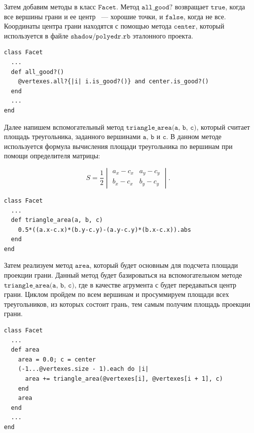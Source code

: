 Затем добавим методы в класс $\texttt{Facet}$. Метод $\texttt{all\_good?}$ возвращает $\texttt{true}$, когда все вершины грани и ее центр ~--- хорошие точки, и $\texttt{false}$, когда не все. Координаты центра грани находятся с помощью метода $\texttt{center}$, который используется в файле $\texttt{shadow/polyedr.rb}$ эталонного проекта.
\begin{small}
\begin{verbatim}
class Facet 
  ...
  def all_good?()
    @vertexes.all?{|i| i.is_good?()} and center.is_good?()
  end
  ...
end
\end{verbatim}
\end{small}

Далее напишем вспомогательный метод $\texttt{triangle\_area(a, b, c)}$, который считает площадь треугольника, заданного вершинами $\texttt{a, b}$ и $\texttt{c}$. В данном методе используется формула вычисления площади треугольника по вершинам при помощи определителя матрицы:

$$ \mathit S = \frac{1}{2}\begin{vmatrix}
a_{x}-c_{x} & a_{y}-c_{y} \\ 
b_{x} - c_{x} & b_{y} - c_{y}
\end{vmatrix} .$$

\begin{small}
\begin{verbatim}
class Facet
  ...
  def triangle_area(a, b, c)
    0.5*((a.x-c.x)*(b.y-c.y)-(a.y-c.y)*(b.x-c.x)).abs
  end
end
\end{verbatim}
\end{small}

Затем реализуем метод $\texttt{area}$, который будет основным для подсчета площади проекции грани. Данный метод будет базироваться на вспомогательном методе $\texttt{triangle\_area(a, b, c)}$, где в качестве агрумента $\texttt{с}$ будет передаваться центр грани. Циклом пройдем по всем вершинам и просуммируем площади всех треугольников, из которых состоит грань, тем самым получим площадь проекции грани.

\begin{small}
\begin{verbatim}
class Facet
  ...
  def area
    area = 0.0; c = center
    (-1...@vertexes.size - 1).each do |i|
      area += triangle_area(@vertexes[i], @vertexes[i + 1], c)
    end
    area
  end
  ...
end
\end{verbatim}
\end{small}

